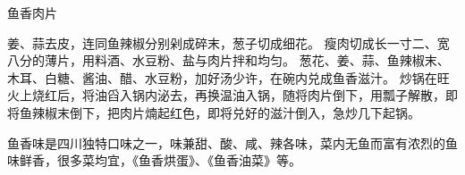 \begin{recipe}{鱼香肉片}

\begin{ingredients}
\end{ingredients}

\begin{cooking}
\step 姜、蒜去皮，连同鱼辣椒分别剁成碎末，葱子切成细花。
\step 瘦肉切成长一寸二、宽八分的薄片，用料酒、水豆粉、盐与肉片拌和均匀。
\step 葱花、姜、蒜、鱼辣椒末、木耳、白糖、酱油、醋、水豆粉，加好汤少许，在碗内兑成鱼香滋汁。
\step 炒锅在旺火上烧红后，将油舀入锅内泌去，再换温油入锅，随将肉片倒下，用瓢子解散，即将鱼辣椒末倒下，把肉片煵起红色，即将兑好的滋汁倒入，急炒几下起锅。
\end{cooking}

\begin{note}
鱼香味是四川独特口味之一，味兼甜、酸、咸、辣各味，菜内无鱼而富有浓烈的鱼味鲜香，很多菜均宜，《鱼香烘蛋》、《鱼香油菜》等。
\end{note}

\end{recipe}

